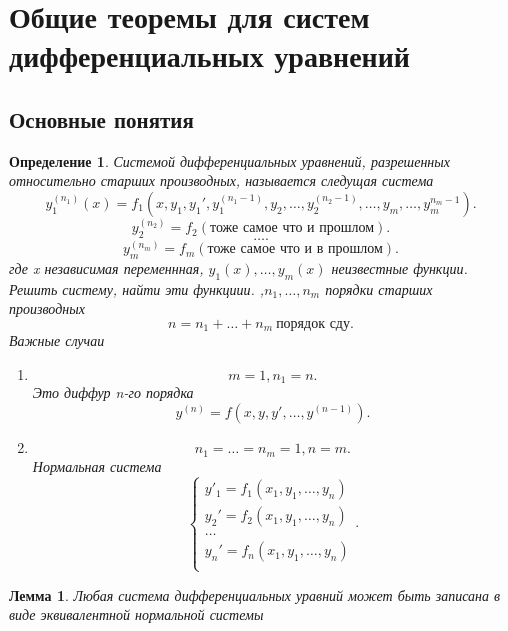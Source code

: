 \documentclass[14pt]{extarticle}
\newtheorem{definition}{Определение}
\newtheorem{lemma}[theorem]{Лемма}
\begin{document}
\section{Общие теоремы для систем дифференциальных уравнений}
\subsection{Основные понятия}
\begin{definition}
	Системой дифференциальных уравнений, разрешенных относительно старших производных,
	называется следущая система
	\[
		y_1^{(n_1)} (x) = f_1(x,y_1,y_1',y_1^{(n_1 - 1)},y_2,\dots,y_{2}^{( n_2-1 )},\dots,y_{m},\dots,y_{m}^{n_{m} - 1})
		.\]
	\[
		y_2^{(n_2)} = f_2(\text{тоже самое что и прошлом})
		.\]
	\[
		\dots
		.\]
	\[
		y_{m}^{(n_{m})} = f_{m} (\text{тоже самое что и в прошлом})
		.\]
	где x независимая переменнная, $y_1(x),\dots,y_{m}(x)$ неизвестные функции.
	Решить систему, найти эти функциии. ,$n_1,\dots,n_{m}$ порядки старших производных
	\[
		n = n_1 +  \dots + n_{m}~  \text{порядок сду}
		.\]
	Важные случаи
	\begin{enumerate}
		\item \[
			      m=1,n_1 = n
			      .\]
		      Это диффур n-го порядка
		      \[
			      y^{(n)} = f(x,y,y',\dots,y^{( n-1 )})
			      .\]

		\item
		      \[
			      n_1 = \dots = n_{m} = 1, n =m
			      .\]
		      Нормальная система
		      \[
			      \begin{cases}
				      y'_{1} =  f_1(x_1,y_1,\dots,y_{n}) \\
				      y_2' = f_2(x_1,y_1,\dots,y_{n})    \\
				      \dots                              \\
				      y_{n}' = f_n(x_1,y_1,\dots,y_{n})  \\
			      \end{cases}
			      .\]
	\end{enumerate}
\end{definition}
\begin{lemma}
	Любая система дифференциальных уравний может быть записана в виде эквивалентной нормальной системы
\end{lemma}
\end{document}

